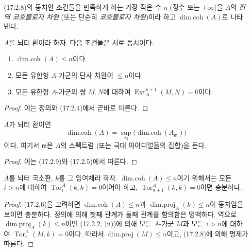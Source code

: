 (17.2.8)의 동치인 조건들을 만족하게 하는 가장 작은 수 $n$ (정수 또는
$+\infty$)을 $A$의 \emph{전역 코호몰로지 차원} (또는 단순히
\emph{코호몰로지 차원})이라 하고 $\operatorname{dim.coh}(A)$로
나타낸다.

\begin{proposition}[17.2.9]
\label{0.17.2.9-fr}
$A$를 뇌터 환이라 하자. 다음 조건들은 서로 동치이다.
\begin{enumerate}
  \item[\rm a)] $\operatorname{dim.coh}(A)\leq n$이다.
  \item[\rm b)] 모든 유한형 $A$-가군의 단사 차원이 $\leq n$이다.
  \item[\rm c)] 모든 유한형 $A$-가군의 쌍 $M,N$에 대하여
  $\operatorname{Ext}^{n+1}_A(M,N)=0$이다.
\end{enumerate}
\end{proposition}

\begin{proof}
이는 정의와 (17.2.4)에서 곧바로 따른다.
\end{proof}

\begin{corollary}[17.2.10]
\label{0.17.2.10-fr}
$A$가 뇌터 환이면
\begin{equation}
\label{0.17.2.10.1-fr}
\tag{17.2.10.1}
  \operatorname{dim.coh}(A)
  =\sup_{\mathfrak{m}}
  \bigl(\operatorname{dim.coh}(A_{\mathfrak{m}})\bigr)
\end{equation}
이다. 여기서 $\mathfrak{m}$은 $A$의 스펙트럼 (또는 극대 아이디얼들의
집합)을 돈다.
\end{corollary}

\begin{proof}
이는 (17.2.9)와 (17.2.5)에서 따른다.
\end{proof}

\begin{proposition}[17.2.11]
\label{0.17.2.11-fr}
$A$를 뇌터 국소환, $k$를 그 잉여체라 하자.
$\operatorname{dim.coh}(A)\leq n$이기 위해서는 모든 $i>n$에 대하여
$\operatorname{Tor}^A_i(k,k)=0$이어야 하고,
$\operatorname{Tor}^A_{n+1}(k,k)=0$이면 충분하다.
\end{proposition}

\begin{proof}
(17.2.6)을 고려하면 $\operatorname{dim.coh}(A)\leq n$과
$\operatorname{dim.proj}_A(k)\leq n$이 동치임을 보이면 충분하다.
정의에 의해 첫째 관계가 둘째 관계를 함의함은 명백하다. 역으로
$\operatorname{dim.proj}_A(k)\leq n$이면 (17.2.2, (ii))에 의해 모든
$A$-가군 $M$과 모든 $i>n$에 대하여
$\operatorname{Tor}^A_i(M,k)=0$이다. 따라서
$\operatorname{dim.proj}(M)\leq n$이고, (17.2.8)에 의해 명제가
따른다.
\end{proof}

